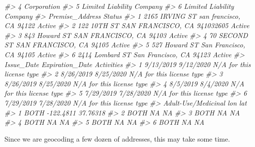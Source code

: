 \documentclass[
  12pt,
  openany]{book}
\newenvironment{Shaded}{\begin{snugshade}}{\end{snugshade}}
\newcommand{\CommentTok}[1]{\textcolor[rgb]{0.37,0.37,0.37}{\textit{#1}}}
\newcommand{\ControlFlowTok}[1]{\textcolor[rgb]{0.27,0.27,0.27}{\textbf{#1}}}
\newcommand{\DecValTok}[1]{\textcolor[rgb]{0.06,0.06,0.06}{#1}}
\newcommand{\FunctionTok}[1]{\textcolor[rgb]{0,0,0}{#1}}
\newcommand{\NormalTok}[1]{#1}
\newcommand{\OtherTok}[1]{\textcolor[rgb]{0.37,0.37,0.37}{#1}}
\newcommand{\SpecialCharTok}[1]{\textcolor[rgb]{0,0,0}{#1}}
\begin{document}
\begin{Shaded}
\begin{Highlighting}[]
\CommentTok{\#\textgreater{} 4               Corporation}
\CommentTok{\#\textgreater{} 5 Limited Liability Company}
\CommentTok{\#\textgreater{} 6 Limited Liability Company}
\CommentTok{\#\textgreater{}                           Premise\_Address Status}
\CommentTok{\#\textgreater{} 1  2165 IRVING ST san francisco, CA 94122 Active}
\CommentTok{\#\textgreater{} 2 122 10TH ST SAN FRANCISCO, CA 941032605 Active}
\CommentTok{\#\textgreater{} 3   843 Howard ST SAN FRANCISCO, CA 94103 Active}
\CommentTok{\#\textgreater{} 4    70 SECOND ST SAN FRANCISCO, CA 94105 Active}
\CommentTok{\#\textgreater{} 5   527 Howard ST San Francisco, CA 94105 Active}
\CommentTok{\#\textgreater{} 6 2414 Lombard ST San Francisco, CA 94123 Active}
\CommentTok{\#\textgreater{}   Issue\_Date Expiration\_Date                Activities}
\CommentTok{\#\textgreater{} 1  9/13/2019       9/12/2020 N/A for this license type}
\CommentTok{\#\textgreater{} 2  8/26/2019       8/25/2020 N/A for this license type}
\CommentTok{\#\textgreater{} 3  8/26/2019       8/25/2020 N/A for this license type}
\CommentTok{\#\textgreater{} 4   8/5/2019        8/4/2020 N/A for this license type}
\CommentTok{\#\textgreater{} 5  7/29/2019       7/28/2020 N/A for this license type}
\CommentTok{\#\textgreater{} 6  7/29/2019       7/28/2020 N/A for this license type}
\CommentTok{\#\textgreater{}   Adult{-}Use/Medicinal       lon      lat}
\CommentTok{\#\textgreater{} 1                BOTH {-}122.4811 37.76318}
\CommentTok{\#\textgreater{} 2                BOTH        NA       NA}
\CommentTok{\#\textgreater{} 3                BOTH        NA       NA}
\CommentTok{\#\textgreater{} 4                BOTH        NA       NA}
\CommentTok{\#\textgreater{} 5                BOTH        NA       NA}
\CommentTok{\#\textgreater{} 6                BOTH        NA       NA}
\end{Highlighting}
\end{Shaded}

Since we are geocoding a few dozen of addresses, this may take some time.

\begin{Shaded}
\end{Shaded}
\end{document}
